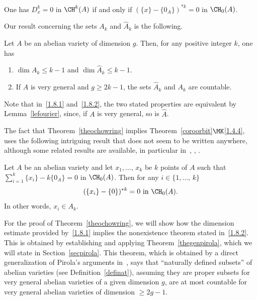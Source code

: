 \begin{lemm}\label{lefourier}
One has $D_x^k=0$ in $\CH^k(A)$ if and only if $(\{x\}-\{0_A\})^{*k}=0$ in $\CH_0(A)$.
\end{lemm}

Our result concerning the sets $A_k$ and $\widehat{A}_k$ is the following.

\begin{theo}\label{theochowring}
Let $A$ be an abelian variety of dimension $g$. Then, for any positive integer $k$, one has
\begin{enumerate}
\item \label{1.8.1} $\dim A_k\leq k-1$ and $\dim \widehat{A}_k\leq k-1$.
\item \label{1.8.2} If $A$ is very general and $g\geq 2k-1$, the sets $\widehat{A}_k$ and $A_k$ are countable.
\end{enumerate}
\end{theo}

Note that in~\eqref{1.8.1} and~\eqref{1.8.2}, the two stated properties are equivalent by Lemma~\ref{lefourier}, since, if $A$ is very general, so is $\widehat{A}$.

The fact that Theorem~\ref{theochowring} implies Theorem~\ref{coroorbit}$\MK$\eqref{1.4.4}, uses the following intriguing result that does not seem to be written anywhere, although some related results are available, in particular in~\cite{colombo}, \cite{herbaut}, \cite{voisindiag}.

\begin{prop}\label{theorelation}
Let $A$ be an abelian variety and let $x_1,\dots,\,x_k$ be $k$ points of $A$ such that $\sum_{i=1}^k\{x_i\}-k\{0_A\}=0$ in $\CH_0(A)$. Then for any $i\in\{1,\dots,\,k\}$
\begin{equation}\label{eqrod}
(\{x_i\}-\{0\})^{*k}=0 \text{ in }\CH_0(A).
\end{equation}
In other words, $x_i\in A_k$.
\end{prop}

For the proof of Theorem~\ref{theochowring}, we will show how the dimension estimate provided by~\eqref{1.8.1} implies the nonexistence theorem stated in~\eqref{1.8.2}. This is obtained by establishing and applying Theorem~\ref{thegenpirola}, which we will state in Section~\ref{secpirola}. This theorem, which is obtained by a direct generalization of Pirola's arguments in~\cite{pirola}, says that ``naturally defined subsets'' of abelian varieties (see Definition~\ref{definat}), assuming they are proper subsets for very general abelian varieties of a given dimension $g$, are at most countable for very general abelian varieties of dimension $\geq 2g-1$.


